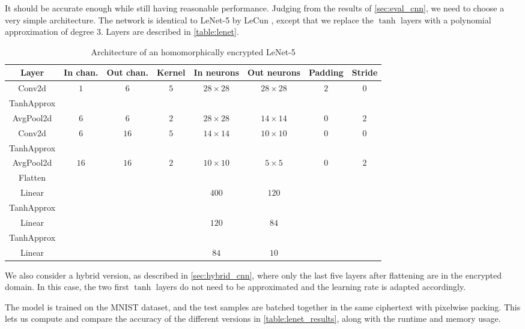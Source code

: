\documentclass[a4paper,11pt,oneside]{report}
\begin{document}
It should be accurate enough while still having reasonable performance.
Judging from the results of \autoref{sec:eval_cnn}, we need to choose a very simple architecture. 
The network is identical to LeNet-5 by LeCun \cite{lecun_gradient-based_1998}, except that we replace the $\tanh$ layers with a polynomial approximation of degree $3$. 
Layers are described in \autoref{table:lenet}.

\begin{table}[h!]
  \begin{center}
    \caption{Architecture of an homomorphically encrypted LeNet-5}
    \label{table:lenet}
    \begin{tabular}{ c c c c c c c c }
    \hline
    Layer & In chan. & Out chan. & Kernel & In neurons & Out neurons & Padding & Stride \\
    \hline
    Conv2d & $1$ & $6$ & $5$ & $28 \times 28$ & $28 \times 28$ & $2$ & $0$ \\
    TanhApprox & & & & & & &  \\
    AvgPool2d & $6$ & $6$ & $2$ & $28 \times 28$ & $14 \times 14$ & $0$ & $2$ \\
    Conv2d & $6$ & $16$ & $5$ & $14 \times 14$ & $10 \times 10$ & $0$ & $0$ \\
    TanhApprox & & & & & & &  \\
    AvgPool2d & $16$ & $16$ & $2$ & $10 \times 10$ & $5 \times 5$ & $0$ & $2$ \\
    Flatten \\
    Linear & & & & $400$ & $120$ & &  \\
    TanhApprox & & & & & & &  \\
    Linear & & & & $120$ & $84$ & &  \\
    TanhApprox & & & & & & &  \\
    Linear & & & & $84$ & $10$ & &  \\
    \hline
    \end{tabular}
  \end{center}
\end{table}

We also consider a hybrid version, as described in \autoref{sec:hybrid_cnn}, where only the last five layers after flattening are in the encrypted domain. In this case, the two first $\tanh$ layers do not need to be approximated and the learning rate is adapted accordingly.

The model is trained on the MNIST dataset, and the test samples are batched together in the same ciphertext with pixelwise packing. This lets us compute and compare the accuracy of the different versions in \autoref{table:lenet_results}, along with the runtime and memory usage.
\end{document}
